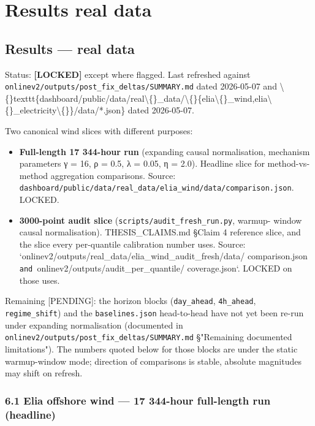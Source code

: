 \documentclass[11pt,a4paper,openany]{report}
\begin{document}
\part*{Results real data}
\chapter{Results — real data}

Status: \textbf{[LOCKED]} except where flagged. Last refreshed against
\texttt{onlinev2/outputs/post\_fix\_deltas/SUMMARY.md} dated 2026-05-07 and
\textbackslash\{\}texttt\{dashboard/public/data/real\textbackslash\{\}\_data/\textbackslash\{\}\{elia\textbackslash\{\}\_wind,elia\textbackslash\{\}\_electricity\textbackslash\{\}\}/data/*.json\}
dated 2026-05-07.

Two canonical wind slices with different purposes:

\begin{itemize}
  \item \textbf{Full-length 17 344-hour run} (expanding causal normalisation,
    mechanism parameters γ = 16, ρ = 0.5, λ = 0.05, η = 2.0). Headline
    slice for method-vs-method aggregation comparisons. Source:
    \texttt{dashboard/public/data/real\_data/elia\_wind/data/comparison.json}.
    LOCKED.
  \item \textbf{3000-point audit slice} (\texttt{scripts/audit\_fresh\_run.py}, warmup-
    window causal normalisation). THESIS\_CLAIMS.md §Claim 4 reference
    slice, and the slice every per-quantile calibration number uses.
    Source: `onlinev2/outputs/real\_data/elia\_wind\_audit\_fresh/data/
    comparison.json\texttt{ and }onlinev2/outputs/audit\_per\_quantile/
    coverage.json`. LOCKED on those uses.
\end{itemize}

Remaining [PENDING]: the horizon blocks (\texttt{day\_ahead}, \texttt{4h\_ahead},
\texttt{regime\_shift}) and the \texttt{baselines.json} head-to-head have not yet been
re-run under expanding normalisation (documented in
\texttt{onlinev2/outputs/post\_fix\_deltas/SUMMARY.md} §"Remaining documented
limitations"). The numbers quoted below for those blocks are under the
static warmup-window mode; direction of comparisons is stable, absolute
magnitudes may shift on refresh.

\section{6.1 Elia offshore wind — 17 344-hour full-length run (headline)}
\end{document}
